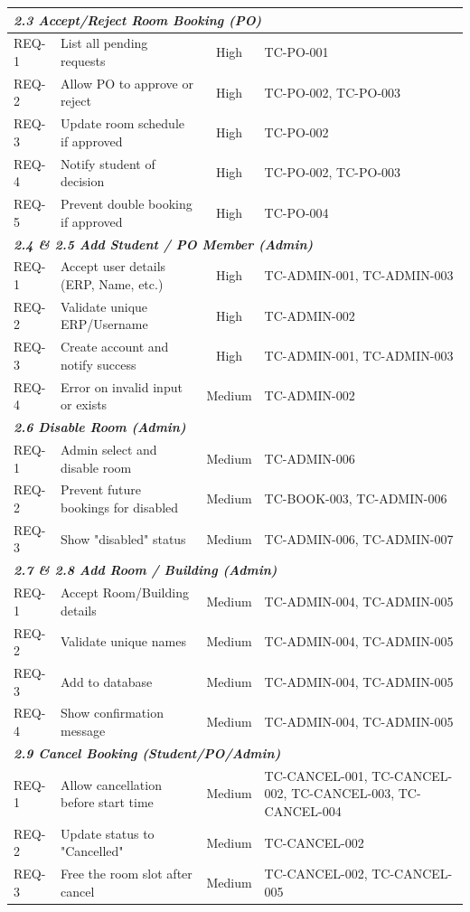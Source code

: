 \documentclass[11pt,a4paper]{article}
\begin{document}
\begin{longtable}{lp{5.5cm}cp{4cm}}
\multicolumn{4}{l}{\textit{\textbf{2.3 Accept/Reject Room Booking (PO)}}} \\ \midrule
REQ-1 & List all pending requests & High & TC-PO-001 \\
REQ-2 & Allow PO to approve or reject & High & TC-PO-002, TC-PO-003 \\
REQ-3 & Update room schedule if approved & High & TC-PO-002 \\
REQ-4 & Notify student of decision & High & TC-PO-002, TC-PO-003 \\
REQ-5 & Prevent double booking if approved & High & TC-PO-004 \\ \midrule

\multicolumn{4}{l}{\textit{\textbf{2.4 \& 2.5 Add Student / PO Member (Admin)}}} \\ \midrule
REQ-1 & Accept user details (ERP, Name, etc.) & High & TC-ADMIN-001, TC-ADMIN-003 \\
REQ-2 & Validate unique ERP/Username & High & TC-ADMIN-002 \\
REQ-3 & Create account and notify success & High & TC-ADMIN-001, TC-ADMIN-003 \\
REQ-4 & Error on invalid input or exists & Medium & TC-ADMIN-002 \\ \midrule

\multicolumn{4}{l}{\textit{\textbf{2.6 Disable Room (Admin)}}} \\ \midrule
REQ-1 & Admin select and disable room & Medium & TC-ADMIN-006 \\
REQ-2 & Prevent future bookings for disabled & Medium & TC-BOOK-003, TC-ADMIN-006 \\
REQ-3 & Show "disabled" status & Medium & TC-ADMIN-006, TC-ADMIN-007 \\ \midrule

\multicolumn{4}{l}{\textit{\textbf{2.7 \& 2.8 Add Room / Building (Admin)}}} \\ \midrule
REQ-1 & Accept Room/Building details & Medium & TC-ADMIN-004, TC-ADMIN-005 \\
REQ-2 & Validate unique names & Medium & TC-ADMIN-004, TC-ADMIN-005 \\
REQ-3 & Add to database & Medium & TC-ADMIN-004, TC-ADMIN-005 \\
REQ-4 & Show confirmation message & Medium & TC-ADMIN-004, TC-ADMIN-005 \\ \midrule

\multicolumn{4}{l}{\textit{\textbf{2.9 Cancel Booking (Student/PO/Admin)}}} \\ \midrule
REQ-1 & Allow cancellation before start time & Medium & TC-CANCEL-001, TC-CANCEL-002, TC-CANCEL-003, TC-CANCEL-004 \\
REQ-2 & Update status to "Cancelled" & Medium & TC-CANCEL-002 \\
REQ-3 & Free the room slot after cancel & Medium & TC-CANCEL-002, TC-CANCEL-005 \\

\end{longtable}
\end{document}
